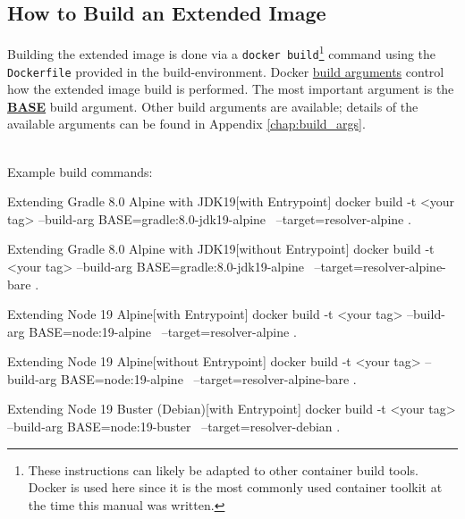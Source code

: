 \subsection{How to Build an Extended Image}

Building the extended image is done via a \texttt{docker build}\footnote{These instructions can likely be adapted to other container build tools.  Docker is used here since it is
the most commonly used container toolkit at the time this manual was written.} command
using the \texttt{Dockerfile} provided in the \cxtoolkit build-environment.
Docker \href{https://docs.docker.com/build/guide/build-args/}{build arguments} control how the extended image build
is performed.  The most important argument is the \hyperref[sec:BASE]{\textbf{BASE}} build argument.  Other build
arguments are available; details of the available arguments can be found in Appendix \ref{chap:build_args}.



\noindent\\Example build commands:

\begin{code}{Extending Gradle 8.0 Alpine with JDK19}{[with Entrypoint]}{}
docker build -t <your tag> --build-arg BASE=gradle:8.0-jdk19-alpine \
    --target=resolver-alpine .
\end{code}

\begin{code}{Extending Gradle 8.0 Alpine with JDK19}{[without Entrypoint]}{}
docker build -t <your tag> --build-arg BASE=gradle:8.0-jdk19-alpine \
    --target=resolver-alpine-bare .
\end{code}

\begin{code}{Extending Node 19 Alpine}{[with Entrypoint]}{}
docker build -t <your tag> --build-arg BASE=node:19-alpine \
    --target=resolver-alpine .
\end{code}

\begin{code}{Extending Node 19 Alpine}{[without Entrypoint]}{}
docker build -t <your tag> --build-arg BASE=node:19-alpine \
    --target=resolver-alpine-bare .
\end{code}
    
\begin{code}{Extending Node 19 Buster (Debian)}{[with Entrypoint]}{}
    docker build -t <your tag> --build-arg BASE=node:19-buster \
        --target=resolver-debian .
\end{code}

